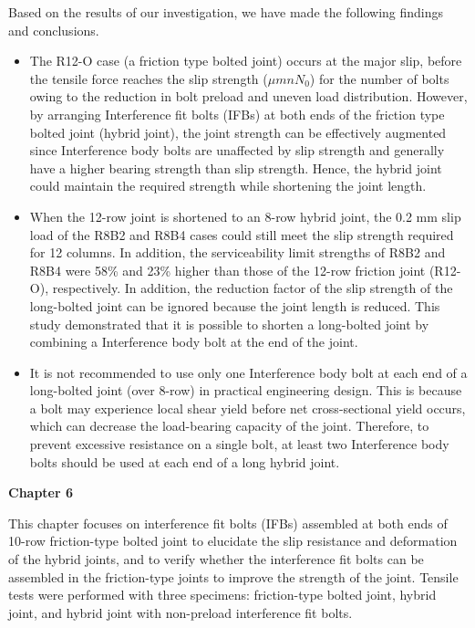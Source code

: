 Based on the results of our investigation, we have made the following findings and conclusions.

\begin{itemize}

\item The R12-O case (a friction type bolted joint) occurs at the major slip, before the tensile force reaches the slip strength ($\mu m n N_0$) for the number of bolts owing to the reduction in bolt preload and uneven load distribution. However, by arranging Interference fit bolts (IFBs) at both ends of the friction type bolted joint (hybrid joint), the joint strength can be effectively augmented since Interference body bolts are unaffected by slip strength and generally have a higher bearing strength than slip strength. Hence, the hybrid joint could maintain the required strength while shortening the joint length.


\item When the 12-row joint is shortened to an 8-row hybrid joint, the 0.2 mm slip load of the R8B2 and R8B4 cases could still meet the slip strength required for 12 columns. In addition, the serviceability limit strengths of R8B2 and R8B4 were 58\% and 23\% higher than those of the 12-row friction joint (R12-O), respectively. In addition, the reduction factor of the slip strength of the long-bolted joint can be ignored because the joint length is reduced. This study demonstrated that it is possible to shorten a long-bolted joint by combining a Interference body bolt at the end of the joint. 

\item It is not recommended to use only one Interference body bolt at each end of a long-bolted joint (over 8-row) in practical engineering design. This is because a bolt may experience local shear yield before net cross-sectional yield occurs, which can decrease the load-bearing capacity of the joint. Therefore, to prevent excessive resistance on a single bolt, at least two Interference body bolts should be used at each end of a long hybrid joint.

\end{itemize}

\textbf{Chapter 6}

This chapter focuses on interference fit bolts (IFBs) assembled at both ends of 10-row friction-type bolted joint to elucidate the slip resistance and deformation of the hybrid joints, and to verify whether the interference fit bolts can be assembled in the friction-type joints to improve the strength of the joint. Tensile tests were performed with three specimens: friction-type bolted joint, hybrid joint, and hybrid joint with non-preload interference fit bolts.

